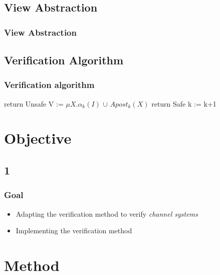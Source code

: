 \documentclass[handout]{beamer}
\begin{document}
\subsection{View Abstraction}
\begin{frame}
  \frametitle{View Abstraction} %
  \begin{exampleblock}{}
    \abstraction
  \end{exampleblock}
\end{frame}


\subsection{Verification Algorithm}
\begin{frame}
  \frametitle{Verification algorithm} %
  \footnotesize
  \begin{algorithmic}[1]
     
    \State return Unsafe
    \EndIf
    \State V := $\mu X.\alpha_k(I)$ $\cup$ $Apost_k(X)$ 
     
    \State return Safe     
    \EndIf
    \State k := k+1 
    \EndWhile
  \end{algorithmic}
\end{frame}

\section{Objective}
\subsection*{1}
\begin{frame}
  \frametitle{Goal}
  \begin{itemize}
  \item
    Adapting the verification method to verify \emph{channel systems}
  \item
    Implementing the verification method
  \end{itemize}
\end{frame}

\begin{frame}
  \tableofcontents
\end{frame}


\section{Method}
\end{document}

